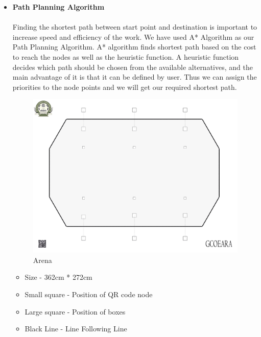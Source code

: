 \begin{itemize}[wide, labelwidth=!, labelindent=0pt]
    \item \textbf{Path Planning Algorithm}
    \vspace{-0.5cm} 
    \paragraph{} Finding the shortest path between start point and destination is important to increase speed and efficiency of the work. We have used A* Algorithm as our Path Planning Algorithm. A* algorithm finds shortest path based on the cost to reach the nodes as well as the heuristic function. A heuristic function decides which path should be chosen from the available alternatives, and the main advantage of it is that it can be defined by user. Thus we can assign the priorities to the node points and we will get our required shortest path.

    \begin{figure}[H]
    \centering
    \includegraphics[width = \textwidth]{project/images/arena.jpg}
    \caption{Arena}
    \end{figure}
    
    \begin{itemize}
        \item Size - 362cm * 272cm
        \item Small square - Position of QR code node
        \item Large square - Position of boxes 
        \item Black Line - Line Following Line
    \end{itemize}


\end{itemize}
